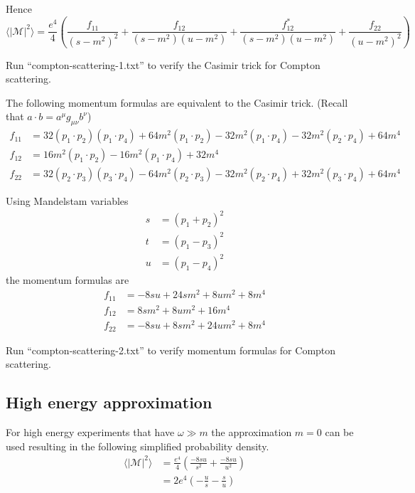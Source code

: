 \documentclass[12pt]{article}
\begin{document}
\noindent
Hence
\begin{equation}
\langle|\mathcal{M}|^2\rangle
=
\frac{e^4}{4}
\left(
\frac{f_{11}}{(s-m^2)^2}
+\frac{f_{12}}{(s-m^2)(u-m^2)}
+\frac{f_{12}^*}{(s-m^2)(u-m^2)}
+\frac{f_{22}}{(u-m^2)^2}
\right)
\end{equation}

\noindent
Run ``compton-scattering-1.txt'' to verify the Casimir trick for Compton scattering.

\bigskip
\noindent
The following momentum formulas are equivalent to the Casimir trick.
(Recall that $a\cdot b=a^\mu g_{\mu\nu}b^\nu$)
\begin{align*}
f_{11}&=
 32 (p_1 \cdot p_2) (p_1 \cdot p_4) +
 64 m^2 (p_1 \cdot p_2) -
 32 m^2 (p_1 \cdot p_4) -
 32 m^2 (p_2 \cdot p_4) + 64 m^4
\\
f_{12}&=16 m^2 (p_1 \cdot p_2) - 16 m^2 (p_1 \cdot p_4) + 32m^4
\\
f_{22}&=
32 (p_2 \cdot p_3) (p_3 \cdot p_4) -
64 m^2 (p_2 \cdot p_3) -
32 m^2 (p_2 \cdot p_4) +
32 m^2 (p_3 \cdot p_4) + 64 m^4
\end{align*}

\noindent
Using Mandelstam variables
\begin{align*}
s&=(p_1+p_2)^2
\\
t&=(p_1-p_3)^2
\\
u&=(p_1-p_4)^2
\end{align*}
the momentum formulas are
\begin{equation}
\begin{aligned}
f_{11}&=-8 s u + 24 s m^2 + 8 u m^2 + 8 m^4
\\
f_{12}&=8 s m^2 + 8 u m^2 + 16 m^4
\\
f_{22}&=-8 s u + 8 s m^2 + 24 u m^2 + 8 m^4
\end{aligned}
\end{equation}

\noindent
Run ``compton-scattering-2.txt'' to verify momentum formulas for Compton scattering.

\subsection*{High energy approximation}
For high energy experiments that have $\omega\gg m$ the approximation $m=0$ can be used
resulting in the following simplified probability density.
\begin{align*}
\langle|\mathcal{M}|^2\rangle
&=\frac{e^4}{4}
\left(\frac{-8su}{s^2}+\frac{-8su}{u^2}\right)
\\
&=2e^4
\left(-\frac{u}{s}-\frac{s}{u}\right)
\end{align*}
\end{document}
